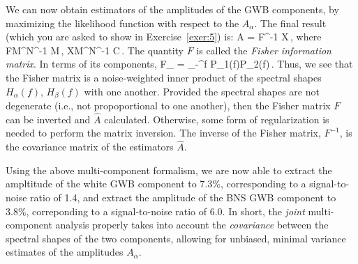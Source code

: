 We can now obtain estimators of the amplitudes of the 
GWB components, by maximizing the likelihood function 
with respect to the $A_\alpha$.
The final result (which you are asked to show in 
Exercise~\ref{exer:5}) is: 
%
\be
\hat A = F^{-1} X\,,
\ee
%
where
%
\be
F\equiv M^\dagger N^{-1} M\,,
\qquad 
X\equiv M^\dagger N^{-1} \hat C\,.
\ee
%
The quantity $F$ is called the 
{\em Fisher information matrix}.
In terms of its components,
%
\be
F_{\alpha\beta} = \int_{-\infty}^\infty \D f\> 
{P_1(f)P_2(f)}\,.
\ee
%
Thus, we see that the Fisher matrix is a noise-weighted 
inner product 
of the spectral shapes $H_\alpha(f)$, $H_\beta(f)$ with one 
another.
Provided the spectral shapes are not degenerate (i.e., not 
propoportional to one another), then the Fisher matrix $F$
can be inverted and $\hat A$ calculated.
Otherwise, some form of regularization is needed to 
perform the matrix inversion.
The inverse of the Fisher matrix, $F^{-1}$, is the covariance 
matrix of the estimators $\hat A$.  

Using the above multi-component formalism, we are now able 
to extract the ampltitude of the white GWB component to 7.3\%, 
corresponding to a signal-to-noise ratio of 1.4, 
and extract
the amplitude of the BNS GWB component to 3.8\%,
correponding to a signal-to-noise ratio of 6.0.
In short, the {\em joint} multi-component analysis 
properly takes into account the {\em covariance}
between the spectral shapes of the two components, 
allowing for unbiased, minimal variance estimates of 
the amplitudes $A_\alpha$.

